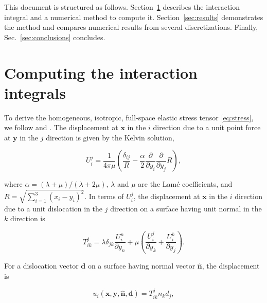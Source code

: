 \documentclass[11pt]{article}
\renewcommand{\vec}[1]{\boldsymbol{#1}}
\newcommand{\uvec}[1]{\hat{\boldsymbol{#1}}}
\begin{document}
This document is structured as follows.
Section~\ref{sec:methods} describes the interaction integral and a numerical method to compute it.
Section~\ref{sec:results} demonstrates the method
and compares numerical results from several discretizations.
Finally, Sec.~\ref{sec:conclusions} concludes.

\section{Computing the interaction integrals} \label{sec:methods}

To derive the homogeneous, isotropic, full-space elastic stress tensor \eqref{eq:stress},
we follow \citet{okada1992internal} and \citet{gimbutas2012calculation}.
The displacement at $\vec{x}$ in the $i$ direction
due to a unit point force at $\vec{y}$ in the $j$ direction is
given by the Kelvin solution,
\begin{linenomath}\begin{equation*}
  U_i^j = \frac{1}{4 \pi \mu} \left( \frac{\delta_{ij}}{R} -
         \frac{\alpha}{2} \frac{\partial}{\partial y_i} \frac{\partial}{\partial y_j} R \right),
\end{equation*}\end{linenomath}
where $\alpha = (\lambda + \mu)/(\lambda + 2 \mu)$,
$\lambda$ and $\mu$ are the Lam\'{e} coefficients,
and $R = \sqrt{\sum_{i=1}^3 (x_i - y_i)^2}$.
%
In terms of $U_i^j$, the displacement at $\vec{x}$ in the $i$ direction
due to a unit dislocation in the $j$ direction
on a surface having unit normal in the $k$ direction is
\begin{linenomath}\begin{equation*}
  T_{ik}^j = \lambda \delta_{jk} \frac{U_i^n}{\partial y_n} +
            \mu \left( \frac{U_i^j}{\partial y_k} + \frac{U_i^k}{\partial y_j} \right).
\end{equation*}\end{linenomath}
For a dislocation vector $\vec{d}$
on a surface having normal vector $\uvec{n}$,
the displacement is
\begin{linenomath}\begin{equation*}
  u_i(\vec{x}, \vec{y}, \uvec{n}, \vec{d}) = T_{ik}^j n_k d_j,
\end{equation*}\end{linenomath}
\end{document}
